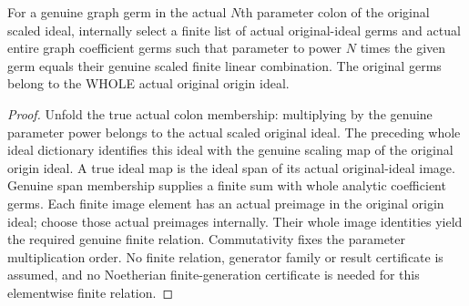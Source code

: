 \begin{lemma}
\label{hir:relative-normal-graph-relations-internal-finite-germs}
\leanok
For a genuine graph germ in the actual $N$th parameter colon of the original scaled ideal, internally select a finite list of actual original-ideal germs and actual entire graph coefficient germs such that parameter to power $N$ times the given germ equals their genuine scaled finite linear combination. The original germs belong to the WHOLE actual original origin ideal.
\end{lemma}
\begin{proof}
Unfold the true actual colon membership: multiplying by the genuine parameter power belongs to the actual scaled original ideal. The preceding whole ideal dictionary identifies this ideal with the genuine scaling map of the original origin ideal. A true ideal map is the ideal span of its actual original-ideal image. Genuine span membership supplies a finite sum with whole analytic coefficient germs. Each finite image element has an actual preimage in the original origin ideal; choose those actual preimages internally. Their whole image identities yield the required genuine finite relation. Commutativity fixes the parameter multiplication order. No finite relation, generator family or result certificate is assumed, and no Noetherian finite-generation certificate is needed for this elementwise finite relation.
\end{proof}

